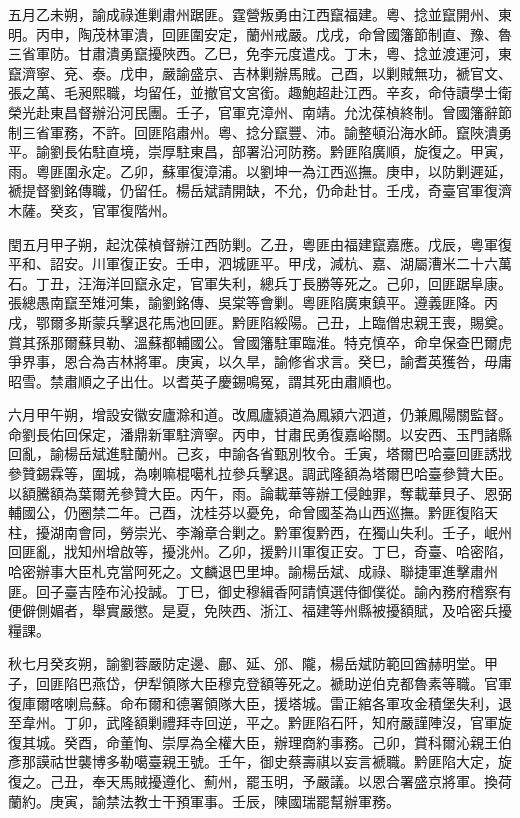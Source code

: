 \begin{pinyinscope}
五月乙未朔，諭成祿進剿肅州踞匪。霆營叛勇由江西竄福建。粵、捻並竄開州、東明。丙申，陶茂林軍潰，回匪圍安定，蘭州戒嚴。戊戌，命曾國籓節制直、豫、魯三省軍防。甘肅潰勇竄擾陜西。乙巳，免李元度遣戍。丁未，粵、捻並渡運河，東竄濟寧、兗、泰。戊申，嚴諭盛京、吉林剿辦馬賊。己酉，以剿賊無功，褫官文、張之萬、毛昶熙職，均留任，並撤官文宮銜。趣鮑超赴江西。辛亥，命侍讀學士衛榮光赴東昌督辦沿河民團。壬子，官軍克漳州、南靖。允沈葆楨終制。曾國籓辭節制三省軍務，不許。回匪陷肅州。粵、捻分竄豐、沛。諭整頓沿海水師。竄陜潰勇平。諭劉長佑駐直境，崇厚駐東昌，部署沿河防務。黔匪陷廣順，旋復之。甲寅，雨。粵匪圍永定。乙卯，蘇軍復漳浦。以劉坤一為江西巡撫。庚申，以防剿遲延，褫提督劉銘傳職，仍留任。楊岳斌請開缺，不允，仍命赴甘。壬戌，奇臺官軍復濟木薩。癸亥，官軍復階州。

閏五月甲子朔，起沈葆楨督辦江西防剿。乙丑，粵匪由福建竄嘉應。戊辰，粵軍復平和、詔安。川軍復正安。壬申，泗城匪平。甲戌，減杭、嘉、湖屬漕米二十六萬石。丁丑，汪海洋回竄永定，官軍失利，總兵丁長勝等死之。己卯，回匪踞阜康。張總愚南竄至雉河集，諭劉銘傳、吳棠等會剿。粵匪陷廣東鎮平。遵義匪降。丙戌，鄂爾多斯蒙兵擊退花馬池回匪。黔匪陷綏陽。己丑，上臨僧忠親王喪，賜奠。賞其孫那爾蘇貝勒、溫蘇都輔國公。曾國籓駐軍臨淮。特克慎卒，命皁保查巴爾虎爭界事，恩合為吉林將軍。庚寅，以久旱，諭修省求言。癸巳，諭耆英獲咎，毋庸昭雪。禁肅順之子出仕。以耆英子慶錫鳴冤，謂其死由肅順也。

六月甲午朔，增設安徽安廬滁和道。改鳳廬潁道為鳳潁六泗道，仍兼鳳陽關監督。命劉長佑回保定，潘鼎新軍駐濟寧。丙申，甘肅民勇復嘉峪關。以安西、玉門諸縣回亂，諭楊岳斌進駐蘭州。己亥，申諭各省甄別牧令。壬寅，塔爾巴哈臺回匪誘戕參贊錫霖等，圍城，為喇嘛棍噶札拉參兵擊退。調武隆額為塔爾巴哈臺參贊大臣。以額騰額為葉爾羌參贊大臣。丙午，雨。論載華等辦工侵蝕罪，奪載華貝子、恩弼輔國公，仍圈禁二年。己酉，沈桂芬以憂免，命曾國荃為山西巡撫。黔匪復陷天柱，擾湖南會同，勞崇光、李瀚章合剿之。黔軍復黔西，在獨山失利。壬子，岷州回匪亂，戕知州增啟等，擾洮州。乙卯，援黔川軍復正安。丁巳，奇臺、哈密陷，哈密辦事大臣札克當阿死之。文麟退巴里坤。諭楊岳斌、成祿、聯捷軍進擊肅州匪。回子臺吉陸布沁投誠。丁巳，御史穆緝香阿請慎選侍御僕從。諭內務府稽察有便僻側媚者，舉實嚴懲。是夏，免陜西、浙江、福建等州縣被擾額賦，及哈密兵擾糧課。

秋七月癸亥朔，諭劉蓉嚴防定邊、鄜、延、邠、隴，楊岳斌防範回酋赫明堂。甲子，回匪陷巴燕岱，伊犁領隊大臣穆克登額等死之。褫助逆伯克都魯素等職。官軍復庫爾喀喇烏蘇。命布爾和德署領隊大臣，援塔城。雷正綰各軍攻金積堡失利，退至韋州。丁卯，武隆額剿禮拜寺回逆，平之。黔匪陷石阡，知府嚴謹陣沒，官軍旋復其城。癸酉，命董恂、崇厚為全權大臣，辦理商約事務。己卯，賞科爾沁親王伯彥那謨祜世襲博多勒噶臺親王號。壬午，御史蔡壽祺以妄言褫職。黔匪陷大定，旋復之。己丑，奉天馬賊擾遵化、薊州，罷玉明，予嚴議。以恩合署盛京將軍。換荷蘭約。庚寅，諭禁法教士干預軍事。壬辰，陳國瑞罷幫辦軍務。


\end{pinyinscope}
